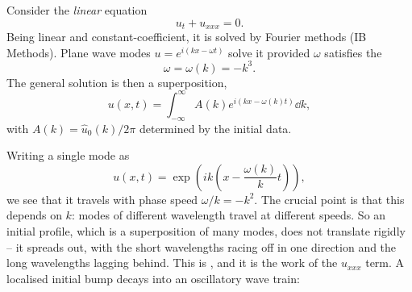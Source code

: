 \documentclass[a4paper]{scrartcl}
\begin{document}
\begin{example}[Dispersion]
	Consider the \emph{linear} equation
	$$
	u_t + u_{xxx} = 0.
	$$
	Being linear and constant-coefficient, it is solved by Fourier methods (IB Methods). Plane wave modes $u = e^{i(kx - \omega t)}$ solve it provided $\omega$ satisfies the 
	$$
	\omega = \omega(k) = -k^3.
	$$
	The general solution is then a superposition,
	$$
	u(x,t) = \int_{-\infty}^\infty A(k)e^{i(kx - \omega(k)t)}\dd k,
	$$
	with $A(k) = \hat u_0(k)/2\pi$ determined by the initial data.

	Writing a single mode as
	$$
	u(x,t) = \exp\left(ik\left(x - \frac{\omega(k)}{k}t\right)\right),
	$$
	we see that it travels with phase speed $\omega/k = -k^2$. The crucial point is that this depends on $k$: modes of different wavelength travel at different speeds. So an initial profile, which is a superposition of many modes, does not translate rigidly -- it spreads out, with the short wavelengths racing off in one direction and the long wavelengths lagging behind. This is , and it is the work of the $u_{xxx}$ term. A localised initial bump decays into an oscillatory wave train:
	\begin{center}
\end{center}
\end{example}
\end{document}
